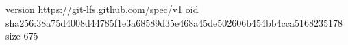 version https://git-lfs.github.com/spec/v1
oid sha256:38a75d4008d44785f1e3a68589d35e468a45de502606b454bb4cca5168235178
size 675

